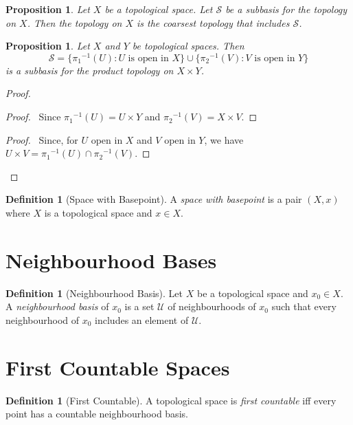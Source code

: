 \documentclass{book}
\let\qed\relax
\newtheorem{prop}[ax]{Proposition}
\theoremstyle{definition}
\newtheorem{df}[ax]{Definition}
\newcommand{\inv}[1]{\ensuremath{{#1}^{-1}}}
\begin{document}
\begin{prop}
Let $X$ be a topological space.
Let $\mathcal{S}$ be a subbasis for the topology on $X$.
Then the topology on $X$ is the coarsest topology that includes $\mathcal{S}$.
\end{prop}


\begin{prop}
Let $X$ and $Y$ be topological spaces. Then
\[ \mathcal{S} = \{ \inv{\pi_1}(U) : U \text{ is open in } X \} \cup \{ \inv{\pi_2}(V) : V \text{ is open in } Y \} \]
is a subbasis for the product topology on $X \times Y$.
\end{prop}

\begin{proof}
\pf
{}
\begin{proof}
	\pf\ Since $\inv{\pi_1}(U) = U \times Y$ and $\inv{\pi_2}(V) = X \times V$.
\end{proof}
\begin{proof}
	\pf\ Since, for $U$ open in $X$ and $V$ open in $Y$, we have $U \times V = \inv{\pi_1}(U) \cap \inv{\pi_2}(V)$.
\end{proof}
\qed
\end{proof}

\begin{df}[Space with Basepoint]
A \emph{space with basepoint} is a pair $(X,x)$ where $X$ is a topological space and $x \in X$.
\end{df}

\section{Neighbourhood Bases}

\begin{df}[Neighbourhood Basis]
Let $X$ be a topological space and $x_0 \in X$. A \emph{neighbourhood basis} of $x_0$ is a set $\mathcal{U}$ of neighbourhoods of $x_0$ such that every neighbourhood of $x_0$ includes an element of $\mathcal{U}$.
\end{df}

\section{First Countable Spaces}

\begin{df}[First Countable]
A topological space is \emph{first countable} iff every point has a countable neighbourhood basis.
\end{df}
\end{document}
